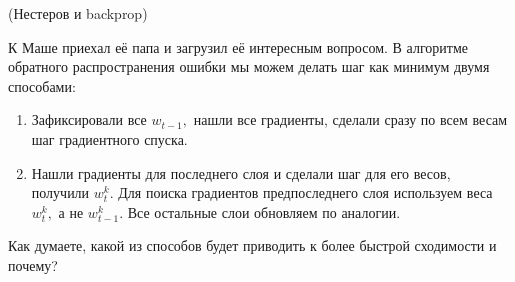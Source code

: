 \begin{problem}{(Нестеров и backprop)}

    
    К Маше приехал её папа и загрузил её интересным вопросом. В алгоритме обратного распространения ошибки мы можем делать шаг как минимум двумя способами: 
    
    \begin{enumerate} 
        \item Зафиксировали все $w_{t-1},$ нашли все градиенты, сделали сразу по всем весам шаг градиентного спуска.
        
        \item Нашли градиенты для последнего слоя и сделали шаг для его весов, получили $w_t^k.$ Для поиска градиентов предпоследнего слоя используем веса  $w_t^k,$ а не $w_{t-1}^k.$ Все остальные слои обновляем по аналогии. 
    \end{enumerate} 
    
    Как думаете, какой из способов будет приводить к более быстрой сходимости и почему? 
\end{problem} 


